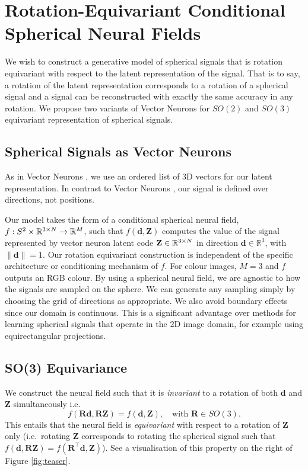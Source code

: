 \section{Rotation-Equivariant Conditional Spherical Neural Fields}\label{sec:RECSNF}

We wish to construct a generative model of spherical signals that is rotation equivariant with respect to the latent representation of the signal. That is to say, a rotation of the latent representation corresponds to a rotation of a spherical signal and a signal can be reconstructed with exactly the same accuracy in any rotation. We propose two variants of Vector Neurons \cite{deng_vector_2021} for $SO(2)$ and $SO(3)$ equivariant representation of spherical signals.

\subsection{Spherical Signals as Vector Neurons}
As in Vector Neurons \cite{deng_vector_2021}, we use an ordered list of 3D vectors for our latent representation. In contrast to Vector Neurons \cite{deng_vector_2021}, our signal is defined over directions, not positions. 

Our model takes the form of a conditional spherical neural field, $f:S^2\times{\mathbb{R}}^{3\times N}\rightarrow {\mathbb{R}}^M$, such that $f(\mathbf{d},\mathbf{Z})$ computes the value of the signal represented by vector neuron latent code $\mathbf{Z}\in{\mathbb{R}}^{3\times N}$ in direction $\mathbf{d}\in\mathbb{R}^3$, with $\|\mathbf{d}\|=1$. Our rotation equivariant construction is independent of the specific architecture or conditioning mechanism of $f$. For colour images, $M=3$ and $f$ outputs an RGB colour. By using a spherical neural field, we are agnostic to how the signals are sampled on the sphere. We can generate any sampling simply by choosing the grid of directions as appropriate. We also avoid boundary effects since our domain is continuous. This is a significant advantage over methods for learning spherical signals that operate in the 2D image domain, for example using equirectangular projections.

\subsection{SO(3) Equivariance}

We construct the neural field such that it is \emph{invariant} to a rotation of both $\mathbf{d}$ and $\mathbf{Z}$ simultaneously i.e.
\begin{equation}
    f(\mathbf{R}\mathbf{d},\mathbf{R}\mathbf{Z})=f(\mathbf{d},\mathbf{Z}),\quad \text{with } \mathbf{R}\in SO(3).\label{eqn:invariance}
\end{equation}
This entails that the neural field is \emph{equivariant} with respect to a rotation of $\mathbf{Z}$ only (i.e.~rotating $\mathbf{Z}$ corresponds to rotating the spherical signal such that $f(\mathbf{d},\mathbf{R}\mathbf{Z})=f(\mathbf{R}^\top\mathbf{d},\mathbf{Z})$). See a visualisation of this property on the right of Figure \ref{fig:teaser}.

